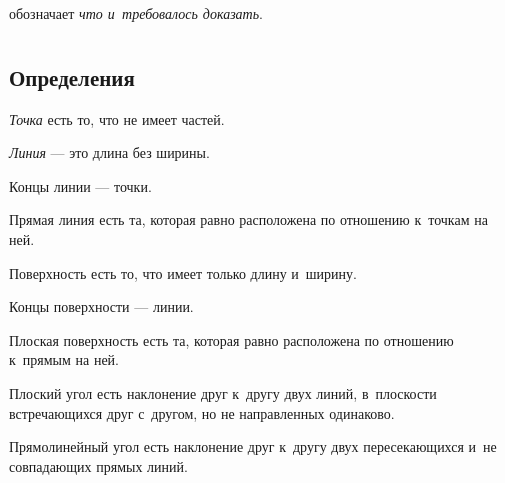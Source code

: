 \documentclass[letters,booklanguage=russian]{byrnebook}
\begin{document}
\symb{\qedstr}
 обозначает \emph{что и~требовалось доказать}.
 
 \part{}
 
 
\chapter*{Определения}

\startdefinition{}\label{def:I.I}
\begin{center}
\emph{Точка} есть то, что не имеет частей.
\end{center}

\startdefinition{}\label{def:I.II}
\begin{center}
\emph{Линия} — это длина без ширины.
\end{center}

\startdefinition{}\label{def:I.III}
\begin{center}
Концы линии — точки.
\end{center}

\startdefinition{}\label{def:I.IV}
\begin{center}
Прямая линия есть та, которая равно расположена по отношению к~точкам на ней.
\end{center}

\startdefinition{}\label{def:I.V}
\begin{center}
Поверхность есть то, что имеет только длину и~ширину.
\end{center}

\startdefinition{}\label{def:I.VI}
\begin{center}
Концы поверхности — линии.
\end{center}

\startdefinition{}\label{def:I.VII}
\begin{center}
Плоская поверхность есть та, которая равно расположена по отношению к~прямым на ней.
\end{center}

\startdefinition{}\label{def:I.VIII}
\begin{center}
Плоский угол есть наклонение друг к~другу двух линий, в~плоскости встречающихся друг с~другом, но не направленных одинаково.
\end{center}

\startdefinition{}\label{def:I.IX}
\begin{center}
\drawCurrentPictureInMargin[inside] Прямолинейный угол есть наклонение друг к~другу двух пересекающихся и~не совпадающих прямых линий.
\end{center}
\end{document}
